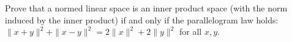 Prove that a normed linear space is an inner product space (with the norm induced by the inner product) if and only if the parallelogram law holds: $\|x + y\|^2 + \|x - y\|^2 = 2\|x\|^2 + 2\|y\|^2$ for all $x, y$.
